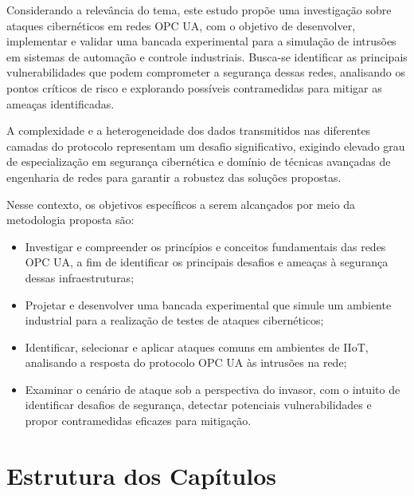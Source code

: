     Considerando a relevância do tema, este estudo propõe uma investigação sobre ataques cibernéticos em redes OPC UA, com o objetivo de desenvolver, implementar e validar uma bancada experimental para a simulação de intrusões em sistemas de automação e controle industriais. Busca-se identificar as principais vulnerabilidades que podem comprometer a segurança dessas redes, analisando os pontos críticos de risco e explorando possíveis contramedidas para mitigar as ameaças identificadas.

    A complexidade e a heterogeneidade dos dados transmitidos nas diferentes camadas do protocolo representam um desafio significativo, exigindo elevado grau de especialização em segurança cibernética e domínio de técnicas avançadas de engenharia de redes para garantir a robustez das soluções propostas.

    Nesse contexto, os objetivos específicos a serem alcançados por meio da metodologia proposta são:

    \begin{itemize}
        \item Investigar e compreender os princípios e conceitos fundamentais das redes OPC UA, a fim de identificar os principais desafios e ameaças à segurança dessas infraestruturas;
        \item Projetar e desenvolver uma bancada experimental que simule um ambiente industrial para a realização de testes de ataques cibernéticos;
        \item Identificar, selecionar e aplicar ataques comuns em ambientes de IIoT, analisando a resposta do protocolo OPC UA às intrusões na rede;
        \item Examinar o cenário de ataque sob a perspectiva do invasor, com o intuito de identificar desafios de segurança, detectar potenciais vulnerabilidades e propor contramedidas eficazes para mitigação.
    \end{itemize}
    
    \section{Estrutura dos Capítulos} \label{sec:estCapitulos}

